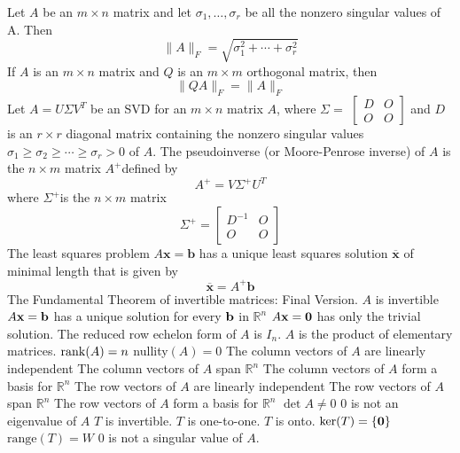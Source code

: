 \documentclass{article}
\begin{document}
\begin{outline}
            \1 Let $A$ be an $m \times n$ matrix and let $\sigma_{1}, \ldots, \sigma_{r}$ be all the nonzero singular values of A. Then
            \[\|A\|_{F}=\sqrt{\sigma_{1}^{2}+\cdots+\sigma_{r}^{2}}\]
            \1 If $A$ is an $m \times n$ matrix and $Q$ is an $m \times m$ orthogonal matrix, then
            \[\|Q A\|_{F}=\|A\|_{F}\]
            \1 Let $A=U \Sigma V^{T}$ be an SVD for an $m \times n$ matrix $A$, where $\Sigma=$ $\left[\begin{array}{ll}D & O \\ O & O\end{array}\right]$ and $D$ is an $r \times r$ diagonal matrix containing the nonzero singular values $\sigma_{1} \geq \sigma_{2} \geq \cdots \geq \sigma_{r}>0$ of $A$. The pseudoinverse (or Moore-Penrose inverse) of $A$ is the $n \times m$ matrix $A^{+}$defined by
            \[A^{+}=V \Sigma^{+} U^{T}\]
            where $\Sigma^{+}$is the $n \times m$ matrix \[\Sigma^{+}=\left[\begin{array}{cc}
            D^{-1} & O \\
            O & O
            \end{array}\right]\]
            \1 The least squares problem $A \mathbf{x}=\mathbf{b}$ has a unique least squares solution $\overline{\mathbf{x}}$ of minimal length that is given by \[\overline{\mathbf{x}}=A^{+} \mathbf{b}\]
            \1 The Fundamental Theorem of invertible matrices: Final Version. 
                \2 $A$ is invertible
                \2 $A\vb x=\vb b$ has a unique solution for every \(\vb b\) in \(\mathbb R^n\)
                \2 \(A\vb x=\vb 0\) has only the trivial solution. 
                \2 The reduced row echelon form of $A$ is \(I_n\). 
                \2 $A$ is the product of elementary matrices. 
                \2 \(\rank (A)=n\)
                \2 nullity\((A)=0\)
                \2 The column vectors of $A$ are linearly independent
                \2 The column vectors of $A$ span \(\mathbb R^n\)
                \2 The column vectors of $A$ form a basis for \(\mathbb R^n\)
                \2 The row vectors of $A$ are linearly independent
                \2 The row vectors of $A$ span \(\mathbb R^n\)
                \2 The row vectors of $A$ form a basis for \(\mathbb R^n\)
                \2 \(\det A\neq 0\)
                \2 $0$ is not an eigenvalue of $A$
                \2 $T$ is invertible. 
                \2 $T$ is one-to-one. 
                \2 $T$ is onto. 
                \2 \(\text{ker}(T)=\{\vb 0\}\)
                \2 \(\text{range}(T)=W\)
                \2 $0$ is not a singular value of $A$. 
    
        \end{outline}
\end{document}

